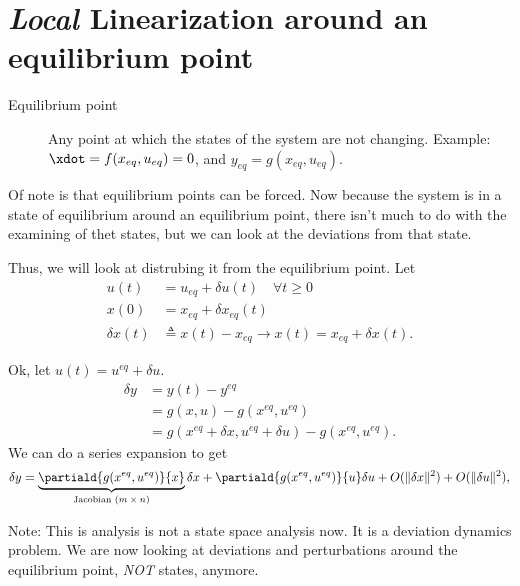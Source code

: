 \documentclass[10pt]{article}
\providecommand{\norm}[1]{\lVert#1\rVert}
\begin{document}
\section{\emph{Local} Linearization around an equilibrium point}
\begin{description}
\item[Equilibrium point] Any point at which the states of the system
  are not changing.  Example: $\xdot = f(x_{eq}, u_{eq}) = 0$, and
  $y_{eq} = g(x_{eq},u_{eq})$.
\end{description}
Of note is that equilibrium points can be forced.
Now because the system is in a state of equilibrium around an
equilibrium point, there isn't much to do with the examining of thet
states, but we can look at the deviations from that state.

Thus, we will look at distrubing it from the equilibrium point.  Let 
\begin{equation}
  \begin{split}
    u(t) &= u_{eq} + \delta u(t) \quad \forall t \ge 0\\
    x(0) &= x_{eq} + \delta x_{eq}(t)\\
    \delta x(t) &\triangleq x(t) - x_{eq} \rightarrow x(t) = x_{eq} +
    \delta x(t). 
  \end{split}
\end{equation}

\newcommand{\meq}[1]{#1^{eq}}

Ok, let $u(t) = \meq{u} + \delta u$.
\begin{equation}
  \begin{split}
    \delta y &= y(t) - \meq{y} \\ 
    &= g(x,u) - g(\meq{x},\meq{u})\\
    &= g(\meq{x}+\delta x,\meq{u}+ \delta u) - g(\meq{x},\meq{u}).
  \end{split}
\end{equation}
We can do a series expansion to get
\begin{equation}\label{eq:delty}
\delta y =
\underbrace{\partiald{g(\meq{x},\meq{u})}{x}}_{\text{Jacobian $(m
    \times n)$}}\delta x +
\partiald{g(\meq{x},\meq{u})}{u}\delta u + O(\norm{\delta x}^2) +
O(\norm{\delta u}^2),
\end{equation}

Note: This is analysis is not a state space analysis now.  It is a
deviation dynamics problem.  We are now looking at deviations and
perturbations around the equilibrium point, \emph{NOT} states,
anymore. 
\end{document}
